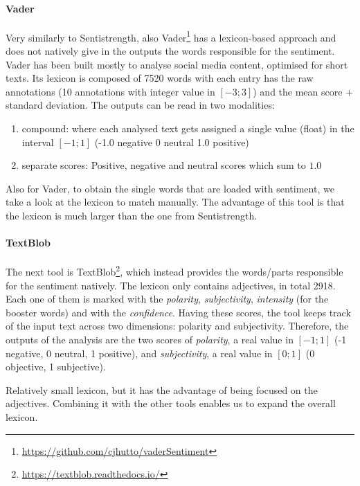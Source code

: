 \paragraph{Vader}
Very similarly to Sentistrength, also Vader\footnote{\url{https://github.com/cjhutto/vaderSentiment}} has a lexicon-based approach and does not natively give in the outputs the words responsible for the sentiment. Vader has been built mostly to analyse social media content, optimised for short texts.
Its lexicon is composed of 7520 words with each entry has the raw annotations (10 annotations with integer value in $[-3;3]$) and the mean score + standard deviation.
The outputs can be read in two modalities:
\begin{enumerate}
    \item compound: where each analysed text gets assigned a single value (float) in the interval $[-1;1]$ (-1.0 negative 0 neutral 1.0 positive)
    \item separate scores: Positive, negative and neutral scores which sum to $1.0$
\end{enumerate}

Also for Vader, to obtain the single words that are loaded with sentiment, we take a look at the lexicon to match manually. The advantage of this tool is that the lexicon is much larger than the one from Sentistrength.



\paragraph{TextBlob}
The next tool is TextBlob\footnote{\url{ https://textblob.readthedocs.io/}}, which instead provides the words/parts responsible for the sentiment natively.
The lexicon only contains adjectives, in total 2918. Each one of them is marked with the \emph{polarity}, \emph{subjectivity}, \emph{intensity} (for the booster words) and with the \emph{confidence}. Having these scores, the tool keeps track of the input text across two dimensions: polarity and subjectivity.
Therefore, the outputs of the analysis are the two scores of \emph{polarity}, a real value in $[-1;1]$ (-1 negative, 0 neutral, 1 positive), and \emph{subjectivity}, a real value in $[0;1]$ (0 objective, 1 subjective).

Relatively small lexicon, but it has the advantage of being focused on the adjectives. Combining it with the other tools enables us to expand the overall lexicon.


